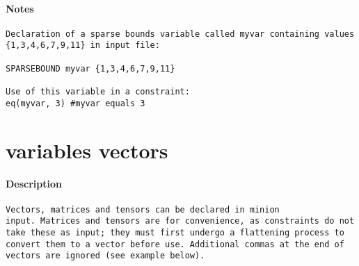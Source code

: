 \paragraph{Notes}
{\footnotesize
\begin{verbatim}
Declaration of a sparse bounds variable called myvar containing values
{1,3,4,6,7,9,11} in input file:

SPARSEBOUND myvar {1,3,4,6,7,9,11}

Use of this variable in a constraint:
eq(myvar, 3) #myvar equals 3
\end{verbatim}
}
\section{variables vectors}
\paragraph{Description}
{\footnotesize
\begin{verbatim}
Vectors, matrices and tensors can be declared in minion
input. Matrices and tensors are for convenience, as constraints do not
take these as input; they must first undergo a flattening process to
convert them to a vector before use. Additional commas at the end of
vectors are ignored (see example below).
\end{verbatim}
}
